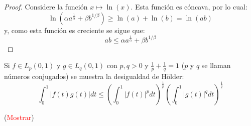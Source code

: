 \documentclass[twoside,12pt,a4 paper,openright]{book}
\begin{document}
\begin{enumerate}
    \begin{proof}
        Considere la funci\'on $x\mapsto \ln(x)$. Esta funci\'on es c\'oncava, por lo cual:
        \begin{equation*}
            \ln(\alpha a^{\frac{1}{\alpha}}+\beta b^{1/\beta})\geq\ln(a)+\ln(b)=\ln(ab)
        \end{equation*}
        y, como esta funci\'on es creciente se sigue que:
        \begin{equation*}
            ab\leq\alpha a^{\frac{1}{\alpha}}+\beta b^{1/\beta}
        \end{equation*}
    \end{proof}

    Si  $f \in L_p(0,1)$ y $g\in L_q(0,1)$ con $p,q>0$ y $\frac{1}{p}+ \frac{1}{q} =1$  ($p$ y $q$ se llaman n\'umeros conjugados) se muestra la desigualdad de  H\"older: 
    \begin{equation*}
        \int_0^1 |f(t) g(t)| dt \leq   \left(  \int_0^1 |f(t)|^p dt\right) ^{\frac{1}{p}}\left(  \int_0^1 |g(t)|^q dt\right) ^{\frac{1}{q}}
    \end{equation*}

    (\textcolor{red}{Mostrar})


\end{enumerate}
\end{document}
